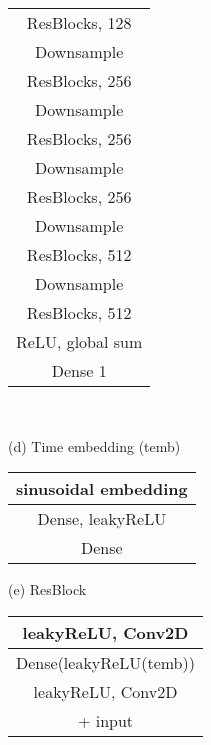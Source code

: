 \documentclass{article} \usepackage{iclr2021_conference,times}
\begin{document}
\begin{table}[ht]
\begin{minipage}[t]{.3\textwidth}
\begin{tabular}{c}
    \midrule
     ResBlocks, 128\\
    Downsample \\
    \midrule
     ResBlocks, 256 \\
    Downsample \\
    \midrule 
    ResBlocks, 256 \\
    Downsample \\
     \midrule 
    ResBlocks, 256 \\
    Downsample \\
     \midrule 
     ResBlocks, 512 \\
    Downsample \\
     \midrule
      ResBlocks, 512 \\
    \midrule 
    ReLU, global sum\\
    Dense 1 \\
    \bottomrule 
\end{tabular}
 \end{minipage}\\
  \begin{minipage}[t]{.3\textwidth}
  \centering
 (d) Time embedding (temb) \\
 \begin{tabular}{c}
    \toprule
 sinusoidal embedding \\
 \midrule
 Dense, leakyReLU\\
 \midrule
Dense\\
    \bottomrule 
\end{tabular}
 \end{minipage} 
  \begin{minipage}[t]{.3\textwidth}
  \centering
 (e) ResBlock \\
 \begin{tabular}{c}
    \toprule
 leakyReLU,  Conv2D \\
 \midrule
  Dense(leakyReLU(temb))\\
 \midrule
 leakyReLU,  Conv2D\\
 \midrule
 + input \\
    \bottomrule 
\end{tabular}
 \end{minipage}
    \label{tabl:structure}
\end{table}
\end{document}
